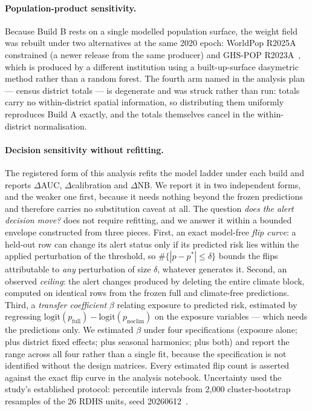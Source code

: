 \paragraph{Population-product sensitivity.} Because Build B rests on a single modelled population surface, the weight field was rebuilt under two alternatives at the same 2020 epoch: WorldPop R2025A constrained (a newer release from the same producer) and GHS-POP R2023A~\cite{Schiavina2023}, which is produced by a different institution using a built-up-surface dasymetric method rather than a random forest. The fourth arm named in the analysis plan --- census district totals --- is degenerate and was struck rather than run: totals carry no within-district spatial information, so distributing them uniformly reproduces Build A exactly, and the totals themselves cancel in the within-district normalisation.

\paragraph{Decision sensitivity without refitting.} The registered form of this analysis refits the model ladder under each build and reports $\Delta$AUC, $\Delta$calibration and $\Delta$NB. We report it in two independent forms, and the weaker one first, because it needs nothing beyond the frozen predictions and therefore carries no substitution caveat at all. The question \emph{does the alert decision move?} does not require refitting, and we answer it within a bounded envelope constructed from three pieces. First, an exact model-free \emph{flip curve}: a held-out row can change its alert status only if its predicted risk lies within the applied perturbation of the threshold, so $\#\{|p-p^*|\le\delta\}$ bounds the flips attributable to \emph{any} perturbation of size $\delta$, whatever generates it. Second, an observed \emph{ceiling}: the alert changes produced by deleting the entire climate block, computed on identical rows from the frozen full and climate-free predictions. Third, a \emph{transfer coefficient} $\beta$ relating exposure to predicted risk, estimated by regressing $\mathrm{logit}(p_{\mathrm{full}})-\mathrm{logit}(p_{\mathrm{noclim}})$ on the exposure variables --- which needs the predictions only. We estimated $\beta$ under four specifications (exposure alone; plus district fixed effects; plus seasonal harmonics; plus both) and report the range across all four rather than a single fit, because the specification is not identified without the design matrices. Every estimated flip count is asserted against the exact flip curve in the analysis notebook. Uncertainty used the study's established protocol: percentile intervals from 2{,}000 cluster-bootstrap resamples of the 26 RDHS units, seed 20260612~\cite{CameronGelbachMiller2008}.

